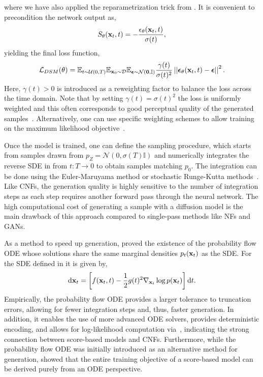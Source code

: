 where we have also applied the reparametrization trick from .
It is convenient to precondition the network output as,
\begin{equation}
    \label{eq:precondition}
    S_\theta(\mathbf{x}_t, t) = - \frac{\epsilon_\theta(\mathbf{x}_t, t)}{\sigma(t)},
\end{equation}
yielding the final loss function,
\begin{equation}
    \label{eq:noise_loss}
    \mathcal{L}_{DSM}(\theta) =
    \mathbb{E}_{t \sim \mathcal{U}(0, T)}
    \mathbb{E}_{\mathbf{x}_0 \sim \mathcal{D}}
    \mathbb{E}_{\boldsymbol{\epsilon} \sim \mathcal{N}(\mathbf{0}, \mathbb{I})}
    \frac{\gamma(t)}{\sigma(t)^2}
    \left|\left|\boldsymbol{\epsilon}_\theta(\mathbf{x}_t, t) - \boldsymbol{\epsilon}\right|\right|^2.
\end{equation}
Here, $\gamma(t) > 0$ is introduced as a reweighting factor to balance the loss across the time domain.
Note that by setting $\gamma(t) = \sigma(t)^2$ the loss is uniformly weighted and this often corresponds to good perceptual quality of the generated samples~\cite{VariationalPerspectiveDiffusionBased, VariationalDiffusionModels, ImprovedDenoisingDiffusion}.
Alternatively, one can use specific weighting schemes to allow training on the maximum likelihood objective~\cite{UnderstandingDiffusionModels}.

Once the model is trained, one can define the sampling procedure, which starts from samples drawn from $p_Z=\mathcal{N}(0, \sigma(T) \mathbb{I})$ and numerically integrates the reverse SDE in  from $t: T \rightarrow 0$ to obtain samples matching $p_0$.
The integration can be done using the Euler-Maruyama method or stochastic Runge-Kutta methods~\cite{NumericalSolutionStochastic}.
Like CNFs, the generation quality is highly sensitive to the number of integration steps as each step requires another forward pass through the neural network.
The high computational cost of generating a sample with a diffusion model is the main drawback of this approach compared to single-pass methods like NFs and GANs.

As a method to speed up generation, \textcite{ScoreBasedGenerativeModeling} proved the existence of the probability flow ODE whose solutions share the same marginal densities $p_t(\mathbf{x}_t)$ as the SDE.
For the SDE defined in  it is given by,
\begin{equation}
    \label{eq:probability_flow}
    \mathrm{d} \mathbf{x}_t = \left[f(\mathbf{x}_t, t) - \frac{1}{2} g(t)^2 \nabla_{\mathbf{x}_t} \log p(\mathbf{x}_t)\right] \mathrm{d} t.
\end{equation}
Empirically, the probability flow ODE provides a larger tolerance to truncation errors, allowing for fewer integration steps and, thus, faster generation.
In addition, it enables the use of more advanced ODE solvers, provides deterministic encoding, and allows for log-likelihood computation via~, indicating the strong connection between score-based models and CNFs.
Furthermore, while the probability flow ODE was initially introduced as an alternative method for generation, \textcite{ElucidatingDesignSpace} showed that the entire training objective of a score-based model can be derived purely from an ODE perspective.

